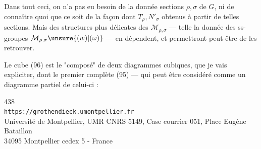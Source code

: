 Dans tout ceci, on n'a pas eu besoin de la donnée  sections $\rho,\sigma$
de $G$, ni de connaître quoi que ce soit de la façon dont $T_\rho,N'_\sigma$
 obtenus à partir de telles sections.
Mais des structures  plus délicates des
$\mathcal{M}_{\rho,\sigma}$ --- telle la donnée des ss-groupes
 $\mathcal{M}_{\rho,\sigma}\unsure{(w)|(\omega)}$ ---
en dépendent, et permettront peut-être de les retrouver.

\uline{} Le cube (96) est le "composé" de deux diagrammes
cubiques, que je vais expliciter, dont le premier complète (95) --- qui peut
être considéré comme un diagramme partiel de celui-ci :


\begin{center}
{\small
438\\
\texttt{https://grothendieck.umontpellier.fr}\\
Université de Montpellier, UMR CNRS 5149, Case courrier 051, Place Eugène Bataillon\\
34095 Montpellier cedex 5 - France
}
\end{center}


